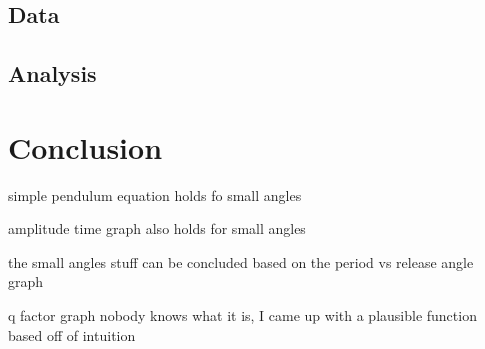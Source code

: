 \documentclass[12pt]{article}
\begin{document}
{\subsection{Data}

\subsection{Analysis}

\section{Conclusion}
simple pendulum equation holds fo small angles

amplitude time graph also holds for small angles

the small angles stuff can be concluded based on the period vs release angle graph

q factor graph nobody knows what it is, I came up with a plausible function based off of intuition

}

\newpage

\printbibliography
\end{document}
